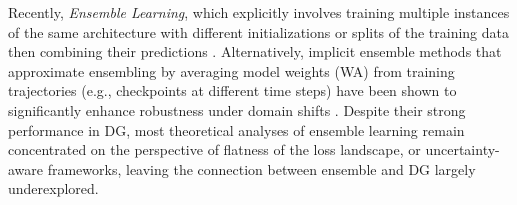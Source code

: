 Recently, \textit{Ensemble Learning}, which explicitly involves training multiple instances of the same architecture with different initializations or splits of the training data then combining their predictions \citep{zhou2021domain, ding2017deep, zhou2021domain, wang2020dofe, mancini2018best, cha2021swad, arpit2022ensemble}. Alternatively, implicit ensemble methods that approximate ensembling by averaging model weights (WA) from training trajectories (e.g., checkpoints at different time steps) have been shown to significantly enhance robustness under domain shifts \citep{izmailov2018averaging, cha2021swad, rame2022diverse, wortsman2022robust}.
Despite their strong performance in DG, most theoretical analyses of ensemble learning remain concentrated on the perspective of flatness of the loss landscape, or uncertainty-aware frameworks, leaving the connection between ensemble and DG largely underexplored.

